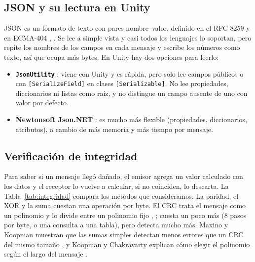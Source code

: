 \documentclass[journal]{IEEEtran}
\begin{document}
\subsection{JSON y su lectura en Unity}
JSON es un formato de texto con pares nombre--valor, definido en el RFC 8259 y en ECMA-404 \cite{rfc8259}, \cite{ecma404}. Se lee a simple vista y casi todos los lenguajes lo soportan, pero repite los nombres de los campos en cada mensaje y escribe los números como texto, así que ocupa más bytes. En Unity hay dos opciones para leerlo:
\begin{itemize}
    \item \textbf{\texttt{JsonUtility}} \cite{unityjson}: viene con Unity y es rápida, pero solo lee campos públicos o con \texttt{[SerializeField]} en clases \texttt{[Serializable]}. No lee propiedades, diccionarios ni listas como raíz, y no distingue un campo ausente de uno con valor por defecto.
    \item \textbf{Newtonsoft Json.NET} \cite{newtonsoft}: es mucho más flexible (propiedades, diccionarios, atributos), a cambio de más memoria y más tiempo por mensaje.
\end{itemize}

\subsection{Verificación de integridad}
Para saber si un mensaje llegó dañado, el emisor agrega un valor calculado con los datos y el receptor lo vuelve a calcular; si no coinciden, lo descarta. La Tabla~\ref{tab:integridad} compara los métodos que consideramos. La paridad, el XOR y la suma cuestan una operación por byte. El CRC trata el mensaje como un polinomio y lo divide entre un polinomio fijo \cite{peterson}, \cite{williams}; cuesta un poco más (8 pasos por byte, o una consulta a una tabla), pero detecta mucho más. Maxino y Koopman muestran que las sumas simples detectan menos errores que un CRC del mismo tamaño \cite{maxino}, y Koopman y Chakravarty explican cómo elegir el polinomio según el largo del mensaje \cite{koopman}.
\end{document}
